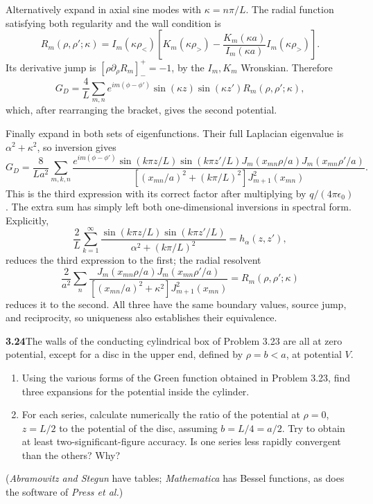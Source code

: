 Alternatively expand in axial sine modes with $\kappa=n\pi/L$.
The radial function satisfying both regularity and the wall condition is
\[
R_m(\rho,\rho';\kappa)=I_m(\kappa\rho_<)
\left[K_m(\kappa\rho_>)-
\frac{K_m(\kappa a)}{I_m(\kappa a)}I_m(\kappa\rho_>)\right].
\]
Its derivative jump is $[\rho\partial_\rho R_m]_-^+=-1$, by
the $I_m,K_m$ Wronskian.  Therefore
\[
G_D=\frac4L\sum_{m,n}e^{im(\phi-\phi')}
\sin(\kappa z)\sin(\kappa z')R_m(\rho,\rho';\kappa),
\]
which, after rearranging the bracket, gives the second potential.

Finally expand in both sets of eigenfunctions.  Their full
Laplacian eigenvalue is $\alpha^2+\kappa^2$, so inversion gives
\[
G_D=\frac8{La^2}\sum_{m,k,n}
\frac{e^{im(\phi-\phi')}\sin(k\pi z/L)\sin(k\pi z'/L)
J_m(x_{mn}\rho/a)J_m(x_{mn}\rho'/a)}
{[(x_{mn}/a)^2+(k\pi/L)^2]J_{m+1}^2(x_{mn})}.
\]
This is the third expression with its correct factor after multiplying
by $q/(4\pi\epsilon_0)$.  The extra sum has simply left both
one-dimensional inversions in spectral form.  Explicitly,
\[
\frac2L\sum_{k=1}^\infty
\frac{\sin(k\pi z/L)\sin(k\pi z'/L)}{\alpha^2+(k\pi/L)^2}
=h_\alpha(z,z'),
\]
reduces the third expression to the first; the radial resolvent
\[
\frac2{a^2}\sum_n
\frac{J_m(x_{mn}\rho/a)J_m(x_{mn}\rho'/a)}
{[(x_{mn}/a)^2+\kappa^2]J_{m+1}^2(x_{mn})}
=R_m(\rho,\rho';\kappa)
\]
reduces it to the second.  All three have the same boundary values,
source jump, and reciprocity, so uniqueness also establishes their
equivalence.

\par\bigskip
\noindent\textbf{3.24}\quad The walls of the conducting cylindrical box of Problem 3.23 are all at zero potential, except for a disc in the upper end, defined by $\rho=b<a$, at potential $V$.
\begin{enumerate}
\item[(a)] Using the various forms of the Green function obtained in Problem 3.23, find three expansions for the potential inside the cylinder.
\item[(b)] For each series, calculate numerically the ratio of the potential at $\rho=0$, $z=L/2$ to the potential of the disc, assuming $b=L/4=a/2$. Try to obtain at least two-significant-figure accuracy. Is one series less rapidly convergent than the others? Why?
\end{enumerate}
(\emph{Abramowitz and Stegun} have tables; \emph{Mathematica} has Bessel functions, as does the software of \emph{Press et al.})
\solution

